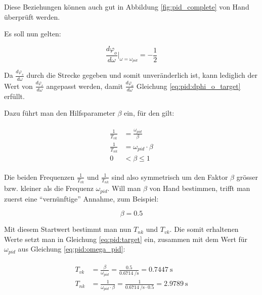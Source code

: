 Diese Beziehungen  k\"onnen auch  gut in Abbildung  \ref{fig:pid_complete} von
Hand \"uberpr\"uft werden.

Es soll nun gelten:

\begin{equation} \label{eq:pid:dphi_o_target}
    \frac{d\varphi_o}{d\omega} \biggr \rvert_{\omega=\omega_{pid}} = - \frac{1}{2}
\end{equation}

Da   $\frac{d\varphi_s}{d\omega}$  durch   die  Strecke   gegeben  und   somit
unver\"anderlich ist, kann lediglich der Wert von $\frac{d\varphi_r}{d\omega}$
angepasst     werden,     damit     $\frac{d\varphi_o}{d\omega}$     Gleichung
\ref{eq:pid:dphi_o_target} erf\"ullt.

Dazu f\"uhrt man den Hilfsparameter $\beta$ ein, f\"ur den gilt:

\begin{gather} \label{eq:pid:beta:start}
    \begin{split}
        \frac{1}{T_{vk}} & = \frac{\omega_{pid}}{\beta} \\
        \frac{1}{T_{nk}} & = \omega_{pid} \cdot \beta  \\
                       0 & <  \beta \leq 1
    \end{split}
\end{gather}

Die  beiden Frequenzen  $\frac{1}{T_{vk}}$  und  $\frac{1}{T_{nk}}$ sind  also
symmetrisch  um den  Faktor $\beta$  gr\"osser bzw.  kleiner als  die Frequenz
$\omega_{pid}$.  Will man  $\beta$ von Hand bestimmen, trifft
man zuerst eine ``vern\"unftige'' Annahme, zum Beispiel:

\begin{equation} \label{eq:pid:beta:initial_value}
    \beta = 0.5
\end{equation}

Mit  diesem Startwert  bestimmt  man nun  $T_{nk}$  und ${T_{vk}}$. Die  somit
erhaltenen Werte setzt man in  Gleichung \ref{eq:pid:target} ein, zusammen mit
dem Wert f\"ur $\omega_{pid}$ aus Gleichung \ref{eq:pid:omega_pid}:

\begin{gather} \label{eq:pid:t_nk_t_vk_initial_results}
    \begin{split}
        {T_{vk}} & = \frac{\beta}{\omega_{pid}}  = \frac{0.5}{\SI{0.6714}{\per\second}}                   = \SI{0.7447}{\second} \\
        {T_{nk}} & = \frac{1}{\omega_{pid} \cdot \beta} = \frac{1}{\SI{0.6714}{\per\second} \cdot 0.5 }  = \SI{2.9789}{\second} \\
    \end{split}
\end{gather}

